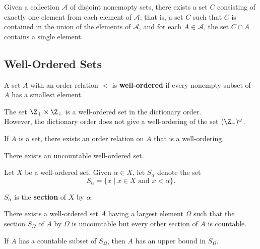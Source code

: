 \begin{theorem}
Given a collection $\mathcal{A}$ of disjoint nonemopty sets, there exists a set $C$ consisting of exactly
one element from each element of $\mathcal{A}$; that is, a set $C$ such that $C$ is contained in the union of the
elements of $\mathcal{A}$, and for each $A \in \mathcal{A}$, the set $C \cap A$ contains a single element.
\end{theorem}

\subsection{Well-Ordered Sets}

\begin{definition}
A set $A$ with an order relation $<$ is \textbf{well-ordered} if every nonempty subset of $A$ has a smallest element.
\end{definition}

\begin{eg}
The set $\Z_+ \times \Z_+$ is a well-ordered set in the dictionary order. \\

However, the dictionary order does not give a well-ordering of the set $(\Z_+)^\omega$.
\end{eg}

\begin{theorem}
If $A$ is a set, there exists an order relation on $A$ that is a well-ordering.
\end{theorem}

\begin{corollary}
There exists an uncountable well-ordered set.    
\end{corollary}

\begin{definition}
Let $X$ be a well-ordered set. Given $\alpha \in X$, let $S_\alpha$ denote the set
\[
    S_\alpha = \{ x \mid x \in X \text{ and } x < \alpha\}.
\]

$S_\alpha$ is the \textbf{section} of $X$ by $\alpha$.
\end{definition}

\begin{lemma}
There exists a well-ordered set $A$ having a largest element $\Omega$ such that the section
$S_\Omega$ of $A$ by $\Omega$ is uncountable but every other section of $A$ is countable.   
\end{lemma}

\begin{theorem}
If $A$ has a countable subset of $S_\Omega$, then $A$ has an upper bound in $S_\Omega$.     
\end{theorem}



